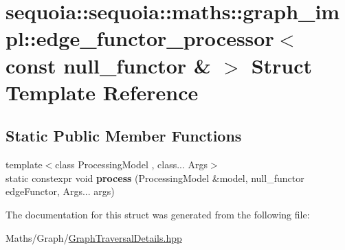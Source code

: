 \hypertarget{structsequoia_1_1sequoia_1_1maths_1_1graph__impl_1_1edge__functor__processor_3_01const_01null__functor_01_6_01_4}{}\section{sequoia\+::sequoia\+::maths\+::graph\+\_\+impl\+::edge\+\_\+functor\+\_\+processor$<$ const null\+\_\+functor \& $>$ Struct Template Reference}
\label{structsequoia_1_1sequoia_1_1maths_1_1graph__impl_1_1edge__functor__processor_3_01const_01null__functor_01_6_01_4}
\subsection*{Static Public Member Functions}
\begin{DoxyCompactItemize}
\item 
\mbox{\label{structsequoia_1_1sequoia_1_1maths_1_1graph__impl_1_1edge__functor__processor_3_01const_01null__functor_01_6_01_4_aac14cbef72619bc2bb89899c007cd153}} 
{\footnotesize template$<$class Processing\+Model , class... Args$>$ }\\static constexpr void {\bfseries process} (Processing\+Model \&model, null\+\_\+functor edge\+Functor, Args... args)
\end{DoxyCompactItemize}


The documentation for this struct was generated from the following file\+:\begin{DoxyCompactItemize}
\item 
Maths/\+Graph/\mbox{\hyperlink{_graph_traversal_details_8hpp}{Graph\+Traversal\+Details.\+hpp}}\end{DoxyCompactItemize}
